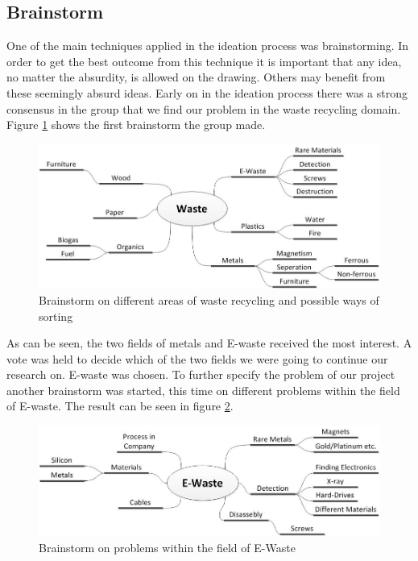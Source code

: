 \subsection{Brainstorm}
One of the main techniques applied in the ideation process was brainstorming. In order to get the best outcome from this technique it is important that any idea, no matter the absurdity, is allowed on the drawing. Others may benefit from these seemingly absurd ideas. Early on in the ideation process there was a strong consensus in the group that we find our problem in the waste recycling domain. Figure \ref{fig:wasteTypesBrainstorm} shows the first brainstorm the group made.

\begin{figure}[!ht]
	\centering
	\includegraphics[scale=.5]{./graphics/wasteTypesBrainstorm.jpg}
	\caption{Brainstorm on different areas of waste recycling and possible ways of sorting}
	\label{fig:wasteTypesBrainstorm}
\end{figure}

As can be seen, the two fields of metals and E-waste received the most interest. A vote was held to decide which of the two fields we were going to continue our research on. E-waste was chosen. To further specify the problem of our project another brainstorm was started, this time on different problems within the field of E-waste. The result can be seen in figure \ref{fig:EWasteBrainstorm}.

\begin{figure}[!ht]
	\centering
	\includegraphics[scale=.5]{./graphics/EWasteBrainstorm.jpg}
	\caption{Brainstorm on problems within the field of E-Waste}
	\label{fig:EWasteBrainstorm}
\end{figure}

